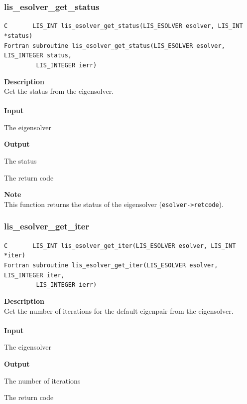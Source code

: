 \documentclass[a4paper]{article}
\newcommand{\namelistlabel}[1]{\mbox{#1}\hfill}
\newenvironment{namelist}[1]{%
\begin{list}{}
  {\let\makelabel\namelistlabel
  \settowidth{\labelwidth}{#1}
  \setlength{\leftmargin}{1.1\labelwidth}}
  }{%
\end{list}}
\begin{document}
\subsubsection{lis\_esolver\_get\_status}
\begin{screen}
\verb|C       LIS_INT lis_esolver_get_status(LIS_ESOLVER esolver, LIS_INT *status)|\\
\verb|Fortran subroutine lis_esolver_get_status(LIS_ESOLVER esolver, LIS_INTEGER status,|\\
\verb|         LIS_INTEGER ierr)|
\end{screen}
{\bf Description}\\
\indent
Get the status from the eigensolver.
\\ \\
\noindent
{\bf Input}
\begin{namelist}{XXXXXXXXXXXXXXXXXXXX}
\item[\tt esolver] The eigensolver
\end{namelist}
{\bf Output}
\begin{namelist}{XXXXXXXXXXXXXXXXXXXX}
\item[\tt status] The status
\item[\tt ierr] The return code
\end{namelist}
{\bf Note}\\
\indent
This function returns the status of the eigensolver ({\tt esolver->retcode}).

\subsubsection{lis\_esolver\_get\_iter}
\begin{screen}
\verb|C       LIS_INT lis_esolver_get_iter(LIS_ESOLVER esolver, LIS_INT *iter)|\\
\verb|Fortran subroutine lis_esolver_get_iter(LIS_ESOLVER esolver, LIS_INTEGER iter,|\\
\verb|         LIS_INTEGER ierr)|
\end{screen}
{\bf Description}\\
\indent
Get the number of iterations for the default eigenpair from the eigensolver.
\\ \\
\noindent
{\bf Input}
\begin{namelist}{XXXXXXXXXXXXXXXXXXXX}
\item[\tt esolver] The eigensolver
\end{namelist}
{\bf Output}
\begin{namelist}{XXXXXXXXXXXXXXXXXXXX}
\item[\tt iter] The number of iterations
\item[\tt ierr] The return code
\end{namelist}
\end{document}
